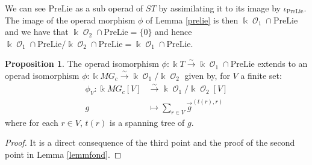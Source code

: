 \documentclass[a4paper]{article}
\DeclareMathOperator{\op}{\mathcal{O}}
\theoremstyle{definition}
\newtheorem{proposition}[definition]{Proposition}
\begin{document}
We can see $\text{PreLie}$ as a sub operad of $ST$ by assimilating it to its image by $\iota_{\text{PreLie}}$. The image of the operad morphism $\phi$ of Lemma \ref{prelie} is then $\Bbbk\op_1\cap\text{PreLie}$ and we have that $\Bbbk\op_2\cap\text{PreLie} = \{0\}$ and hence $\Bbbk\op_1\cap\text{PreLie}/\Bbbk\op_2\cap\text{PreLie} = \Bbbk\op_1\cap\text{PreLie}$.


\begin{proposition}
The operad isomorphism $\phi: \Bbbk T \stackrel{\sim}\longrightarrow \Bbbk \op_1\cap\text{PreLie}$ extends to an operad isomorphism $\phi: \Bbbk MG_c \stackrel{\sim}\longrightarrow \Bbbk\op_1/\Bbbk\op_2$  given by, for $V$ a finite set:
\begin{align*}
\phi_V: \Bbbk MG_c[V] &\stackrel{\sim}\longrightarrow \Bbbk\op_1/\Bbbk\op_2[V]\\
g &\longmapsto \sum_{r\in V}\overrightarrow{g}^{(t(r),r)}
\end{align*}
where for each $r\in V$, $t(r)$ is a spanning tree of $g$.
\end{proposition}

\begin{proof}
It is a direct consequence of the third point and the proof of the second point in Lemma \ref{lemmfond}.
\end{proof}
\end{document}
